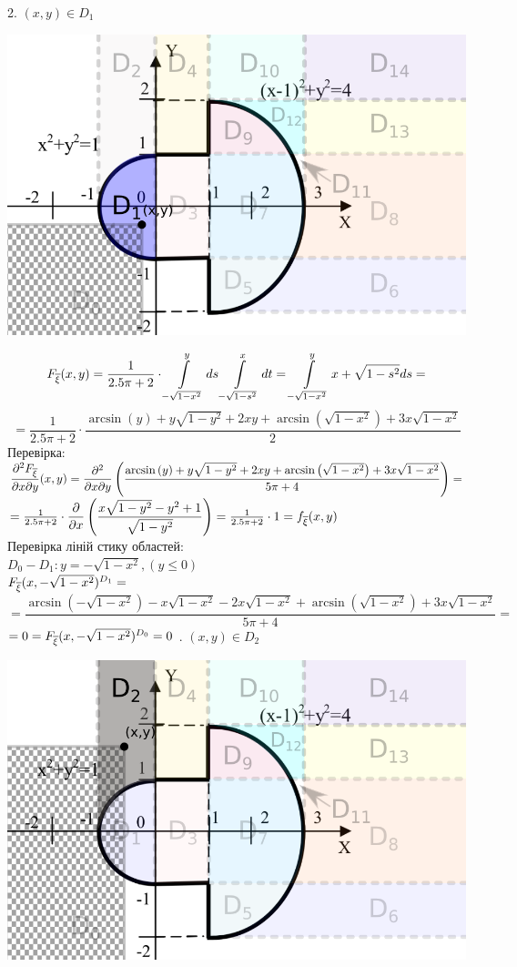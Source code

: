 \documentclass[14pt,a4paper]{scrartcl}
\theoremstyle{definition}
\theoremstyle{remark}
\theoremstyle{definition}
\theoremstyle{definition}
\begin{document}
2. $(x,y) \in D_1$
\begin{center} \includegraphics[scale=0.4]{assets/zone21.png} \end{center}
$$
F_{\overline{\xi}} (x,y) =  \frac{1}{2.5\pi + 2} \cdot  \int\limits_{-\sqrt{1- x^2}}^{y}{ds  \int\limits_{-\sqrt{1-s^2}}^{x}{dt}} =   \int\limits_{-\sqrt{1- x^2}}^{y}{x+\sqrt{1-s^2}ds  } =
$$
$$
=\frac{1}{2.5\pi + 2} \cdot \dfrac{\arcsin\left(y\right)+y\sqrt{1-y^2}+2xy+\arcsin\left(\sqrt{1-x^2}\right)+3x\sqrt{1-x^2}}{2}
$$
Перевірка:\\
$\dfrac{\partial^2 F_{\overline{\xi}}}{\partial x \partial y}(x,y) = \dfrac{\partial^2}{\partial x \partial y} \left( \dfrac{\arcsin\left(y\right)+y\sqrt{1-y^2}+2xy+\arcsin\left(\sqrt{1-x^2}\right)+3x\sqrt{1-x^2}}{5\pi + 4}  \right) =$\\
$ = \frac{1}{2.5\pi + 2} \cdot \dfrac{\partial}{\partial x} \left( \dfrac{x\sqrt{1-y^2}-y^2+1}{\sqrt{1-y^2}} \right) =\frac{1}{2.5\pi + 2} \cdot 1  =f_{\overline{\xi}} (x,y)$\\
Перевірка ліній стику областей:\\
$D_0 - D_1: y = -\sqrt{1- x^2}, (y \leq 0)$\\
$ F_{\overline{\xi}} (x,-\sqrt{1- x^2})^{D_1} = $\\
$=\dfrac{\arcsin\left(-\sqrt{1-x^2}\right)-x\sqrt{1-x^2}-2x\sqrt{1-x^2}+\arcsin\left(\sqrt{1-x^2}\right)+3x\sqrt{1-x^2}}{5\pi + 4} =$
\\$= 0= F_{\overline{\xi}} (x,-\sqrt{1- x^2})^{D_0} = 0$
. $(x,y) \in D_2$
\begin{center} \includegraphics[scale=0.4]{assets/zone32.png} \end{center}
\end{document}
